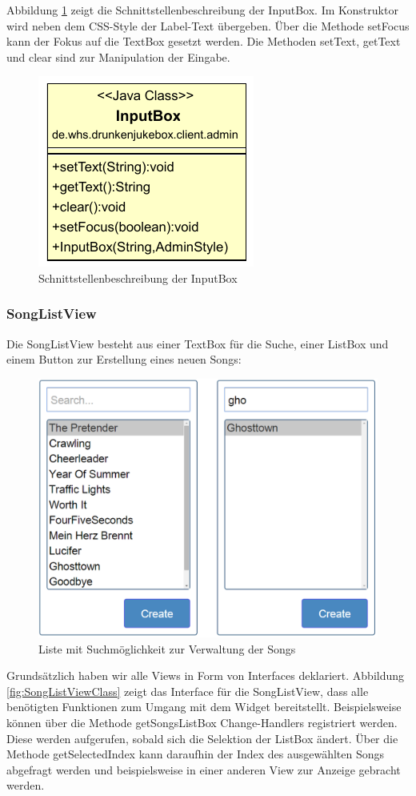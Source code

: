 Abbildung \ref{fig:InputBoxClass} zeigt die Schnittstellenbeschreibung der InputBox. Im Konstruktor wird neben dem CSS-Style der Label-Text übergeben. Über die Methode setFocus kann der Fokus auf die TextBox gesetzt werden. Die Methoden setText, getText und clear sind zur Manipulation der Eingabe.

\begin{figure}[H]
\centering
\includegraphics[width=0.3\linewidth]{Bilder/InputBoxClass}
\caption{Schnittstellenbeschreibung der InputBox}
\label{fig:InputBoxClass}
\end{figure}


\subsubsection{SongListView}
Die SongListView besteht aus einer TextBox für die Suche, einer ListBox und einem Button zur Erstellung eines neuen Songs:

\begin{figure}[H]
\centering
\includegraphics[width=0.7\linewidth]{Bilder/SongListView}
\caption{Liste mit Suchmöglichkeit zur Verwaltung der Songs}
\label{fig:SongListView}
\end{figure}

Grundsätzlich haben wir alle Views in Form von Interfaces deklariert. Abbildung \ref{fig:SongListViewClass} zeigt das Interface für die SongListView, dass alle benötigten Funktionen zum Umgang mit dem Widget bereitstellt. Beispielsweise können über die Methode getSongsListBox Change-Handlers registriert werden. Diese werden aufgerufen, sobald sich die Selektion der ListBox ändert. Über die Methode getSelectedIndex kann daraufhin der Index des ausgewählten Songs abgefragt werden und beispielsweise in einer anderen View zur Anzeige gebracht werden.

